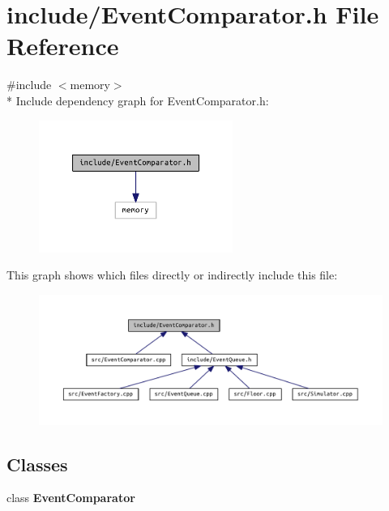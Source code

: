 \section{include/\+Event\+Comparator.h File Reference}
\label{_event_comparator_8h}
{\ttfamily \#include $<$memory$>$}\\*
Include dependency graph for Event\+Comparator.\+h\+:\nopagebreak
\begin{figure}[H]
\begin{center}
\leavevmode
\includegraphics[width=179pt]{_event_comparator_8h__incl}
\end{center}
\end{figure}
This graph shows which files directly or indirectly include this file\+:\nopagebreak
\begin{figure}[H]
\begin{center}
\leavevmode
\includegraphics[width=350pt]{_event_comparator_8h__dep__incl}
\end{center}
\end{figure}
\subsection*{Classes}
\begin{DoxyCompactItemize}
\item 
class {\bf Event\+Comparator}
\end{DoxyCompactItemize}

